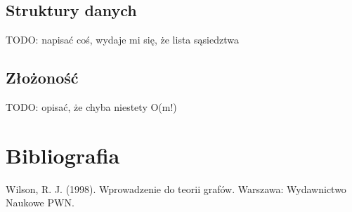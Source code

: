 \documentclass[a4 122pt]{article}
\begin{document}
	\subsection{Struktury danych}
	TODO: napisać coś, wydaje mi się, że lista sąsiedztwa
	
	\subsection{Złożoność}
	
	TODO: opisać, że chyba niestety O(m!)
	
	\section{Bibliografia}

		Wilson, R. J. (1998). Wprowadzenie do teorii grafów. Warszawa: Wydawnictwo Naukowe PWN.
\end{document}
